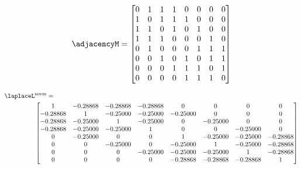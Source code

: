\begin{equation}
\adjacencyM =
\begin{bmatrix}
0 & 1 & 1 & 1 & 0 & 0 & 0 & 0 \\
1 & 0 & 1 & 1 & 1 & 0 & 0 & 0 \\
1 & 1 & 0 & 1 & 0 & 1 & 0 & 0 \\
1 & 1 & 1 & 0 & 0 & 0 & 1 & 0 \\
0 & 1 & 0 & 0 & 0 & 1 & 1 & 1 \\
0 & 0 & 1 & 0 & 1 & 0 & 1 & 1 \\
0 & 0 & 0 & 1 & 1 & 1 & 0 & 1 \\
0 & 0 & 0 & 0 & 1 & 1 & 1 & 0
\end{bmatrix}
\end{equation}

\begin{align}
\laplaceL&^{\text{norm}} = \nonumber\\
&\begin{bmatrix}
1 & -0.28868 & -0.28868 & -0.28868 & 0 & 0 & 0 & 0 \\
-0.28868 &  1 & -0.25000 & -0.25000 & -0.25000 & 0 & 0 & 0 \\
-0.28868 & -0.25000 &  1 & -0.25000 & 0 & -0.25000 & 0 & 0 \\
-0.28868 & -0.25000 & -0.25000 &  1 & 0 & 0 & -0.25000 & 0 \\
0 & -0.25000 & 0 & 0 &  1 & -0.25000 & -0.25000 & -0.28868 \\
0 & 0 & -0.25000 & 0 & -0.25000 &  1 & -0.25000 & -0.28868 \\
0 & 0 & 0 & -0.25000 & -0.25000 & -0.25000 &  1 & -0.28868 \\
0 & 0 & 0 & 0 & -0.28868 & -0.28868 & -0.28868 &  1
\end{bmatrix}
\end{align}
